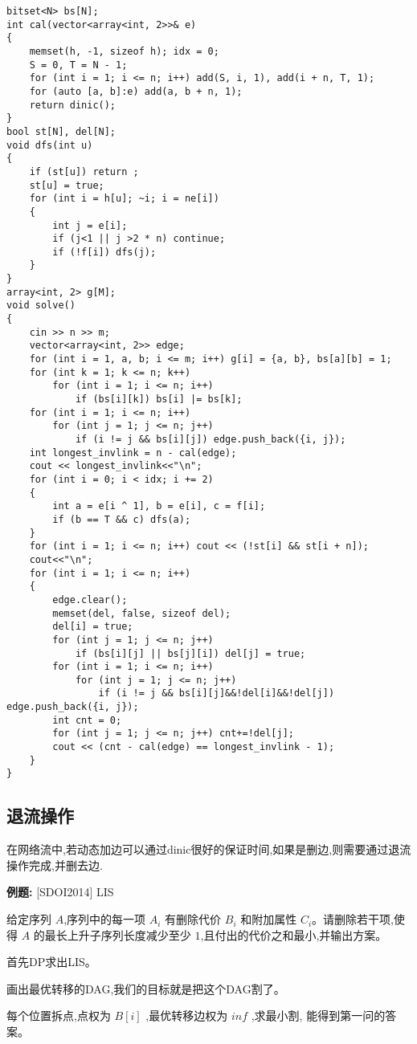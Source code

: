 \documentclass[a4paper, fontset=none]{ctexart}
\begin{document}
\begin{verbatim}
bitset<N> bs[N];
int cal(vector<array<int, 2>>& e)
{
    memset(h, -1, sizeof h); idx = 0;
    S = 0, T = N - 1;
    for (int i = 1; i <= n; i++) add(S, i, 1), add(i + n, T, 1);
    for (auto [a, b]:e) add(a, b + n, 1);
    return dinic();
}
bool st[N], del[N];
void dfs(int u)
{
    if (st[u]) return ;
    st[u] = true;
    for (int i = h[u]; ~i; i = ne[i])
    {
        int j = e[i];
        if (j<1 || j >2 * n) continue;
        if (!f[i]) dfs(j);
    }
}
array<int, 2> g[M];
void solve()
{
    cin >> n >> m;
    vector<array<int, 2>> edge;
    for (int i = 1, a, b; i <= m; i++) g[i] = {a, b}, bs[a][b] = 1;
    for (int k = 1; k <= n; k++)
        for (int i = 1; i <= n; i++)
            if (bs[i][k]) bs[i] |= bs[k];
    for (int i = 1; i <= n; i++)
        for (int j = 1; j <= n; j++)
            if (i != j && bs[i][j]) edge.push_back({i, j});
    int longest_invlink = n - cal(edge);
    cout << longest_invlink<<"\n";
    for (int i = 0; i < idx; i += 2)
    {
        int a = e[i ^ 1], b = e[i], c = f[i];
        if (b == T && c) dfs(a);
    }
    for (int i = 1; i <= n; i++) cout << (!st[i] && st[i + n]);
    cout<<"\n";
    for (int i = 1; i <= n; i++)
    {
        edge.clear();
        memset(del, false, sizeof del);
        del[i] = true;
        for (int j = 1; j <= n; j++)
            if (bs[i][j] || bs[j][i]) del[j] = true;
        for (int i = 1; i <= n; i++)
            for (int j = 1; j <= n; j++)
                if (i != j && bs[i][j]&&!del[i]&&!del[j]) edge.push_back({i, j});
        int cnt = 0;
        for (int j = 1; j <= n; j++) cnt+=!del[j];
        cout << (cnt - cal(edge) == longest_invlink - 1);
    }
}
\end{verbatim}
\subsection{退流操作}

在网络流中,若动态加边可以通过dinic很好的保证时间,如果是删边,则需要通过退流操作完成,并删去边.

\textbf{例题:}
[SDOI2014] LIS

给定序列 $A$,序列中的每一项 $A_i$ 有删除代价 $B_i$ 和附加属性 $C_i$。请删除若干项,使得 $A$ 的最长上升子序列长度减少至少 $1$,且付出的代价之和最小,并输出方案。

首先DP求出LIS。

画出最优转移的DAG,我们的目标就是把这个DAG割了。

每个位置拆点,点权为 $B[i]$ ,最优转移边权为 $inf$ ,求最小割, 能得到第一问的答案。
\end{document}
